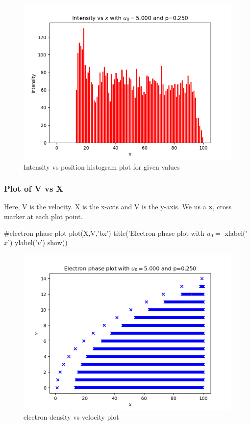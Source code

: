 \documentclass[11pt]{article}
\begin{document}
\begin{figure}[H]
    \centering
    \includegraphics[scale = 1]{1_b.png}
    \caption{Intensity vs position histogram plot for given values}
\end{figure}

\subsubsection{Plot of V vs X}
Here, V is the velocity. X is the x-axis and V is the y-axis. We us a \textbf{x}, cross marker at each plot point.
\begin{python}
#electron phase plot
plot(X,V,'bx')
title('Electron phase plot with $u_0=$%
xlabel('$x$')
ylabel('$v$')
show()
\end{python}

\begin{figure}[H]
    \centering
    \includegraphics[scale = 1]{1_c.png}
    \caption{electron density vs velocity plot}
\end{figure}
\end{document}
